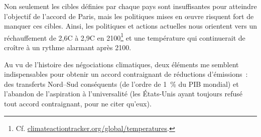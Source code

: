 \documentclass[a5paper,french,openany]{memoir}
\begin{document}
Non seulement les cibles définies par chaque pays sont insuffisantes pour atteindre l'objectif de l'accord de Paris, mais les politiques mises en œuvre risquent fort de manquer ces cibles. Ainsi, les politiques et actions actuelles nous orientent vers un réchauffement de 2,6\textdegree{}C à 2,9\textdegree{}C en 2100\footnote{Cf. \href{https://climateactiontracker.org/global/temperatures/}{climateactiontracker.org/global/temperatures}.} et une température qui continuerait de croître à un rythme alarmant après 2100. 

Au vu de l'histoire des négociations climatiques, deux éléments me semblent indispensables pour obtenir un accord contraignant de réductions d'émissions~: des transferts Nord--Sud conséquents (de l'ordre de 1~\% du PIB mondial) et l'abandon de l'aspiration à l'universalité (les États-Unis ayant toujours refusé tout accord contraignant, pour ne citer qu'eux).
\end{document}
